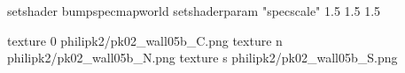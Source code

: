 setshader bumpspecmapworld
setshaderparam "specscale" 1.5 1.5 1.5

texture 0 philipk2/pk02_wall05b_C.png
texture n philipk2/pk02_wall05b_N.png
texture s philipk2/pk02_wall05b_S.png

